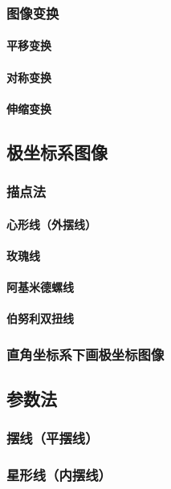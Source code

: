 \documentclass[UTF8, 12pt]{ctexart}
\begin{document}
\subsubsection{图像变换}
\paragraph{平移变换}
\paragraph{对称变换}
\paragraph{伸缩变换}
\subsection{极坐标系图像}
\subsubsection{描点法}
\paragraph{心形线（外摆线）}
\paragraph{玫瑰线}
\paragraph{阿基米德螺线}
\paragraph{伯努利双扭线}
\subsubsection{直角坐标系下画极坐标图像}
\subsection{参数法}
\subsubsection{摆线（平摆线）}
\subsubsection{星形线（内摆线）}
\end{document}
